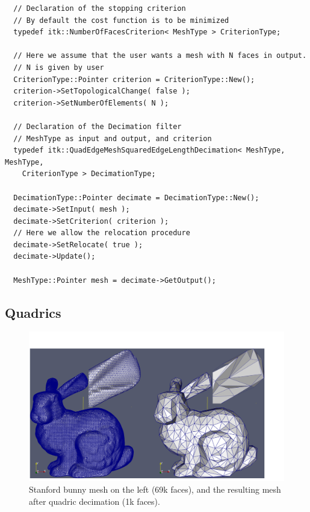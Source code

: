 \documentclass{InsightArticle}
\theoremstyle{plain}
\begin{document}
\begin{verbatim}
  // Declaration of the stopping criterion
  // By default the cost function is to be minimized
  typedef itk::NumberOfFacesCriterion< MeshType > CriterionType;

  // Here we assume that the user wants a mesh with N faces in output.
  // N is given by user
  CriterionType::Pointer criterion = CriterionType::New();
  criterion->SetTopologicalChange( false );
  criterion->SetNumberOfElements( N );

  // Declaration of the Decimation filter
  // MeshType as input and output, and criterion
  typedef itk::QuadEdgeMeshSquaredEdgeLengthDecimation< MeshType, MeshType,
    CriterionType > DecimationType;

  DecimationType::Pointer decimate = DecimationType::New();
  decimate->SetInput( mesh );
  decimate->SetCriterion( criterion );
  // Here we allow the relocation procedure
  decimate->SetRelocate( true );
  decimate->Update();

  MeshType::Pointer mesh = decimate->GetOutput();
\end{verbatim}

\subsection{Quadrics}

\begin{figure}[tb]
  \centering
  \includegraphics[width=1.\textwidth]{bunny_comp}
  \caption{Stanford bunny mesh on the left (69k faces), and the resulting mesh after quadric decimation (1k faces).}
  \label{fig:bunny_quadric}
\end{figure}
\end{document}
